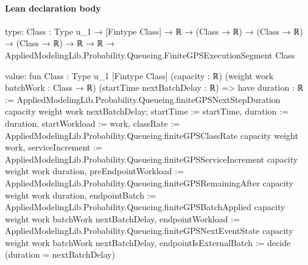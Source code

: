 \documentclass[10pt]{article}
\begin{document}
\paragraph{Lean declaration body}
\begin{ReviewVerbatim}
type:
{Class : Type u_1} →
  [Fintype Class] →
    ℝ →
      (Class → ℝ) →
        (Class → ℝ) → (Class → ℝ) → ℝ → ℝ → AppliedModelingLib.Probability.Queueing.FiniteGPSExecutionSegment Class

value:
fun {Class : Type u_1} [Fintype Class] (capacity : ℝ) (weight work batchWork : Class → ℝ)
    (startTime nextBatchDelay : ℝ) =>
  have duration : ℝ :=
    AppliedModelingLib.Probability.Queueing.finiteGPSNextStepDuration capacity weight work nextBatchDelay;
  { startTime := startTime, duration := duration, startWorkload := work,
    classRate := AppliedModelingLib.Probability.Queueing.finiteGPSClassRate capacity weight work,
    serviceIncrement := AppliedModelingLib.Probability.Queueing.finiteGPSServiceIncrement capacity weight work duration,
    preEndpointWorkload :=
      AppliedModelingLib.Probability.Queueing.finiteGPSRemainingAfter capacity weight work duration,
    endpointBatch :=
      AppliedModelingLib.Probability.Queueing.finiteGPSBatchApplied capacity weight work batchWork nextBatchDelay,
    endpointWorkload :=
      AppliedModelingLib.Probability.Queueing.finiteGPSNextEventState capacity weight work batchWork nextBatchDelay,
    endpointIsExternalBatch := decide (duration = nextBatchDelay) }
\end{ReviewVerbatim}
\end{document}
